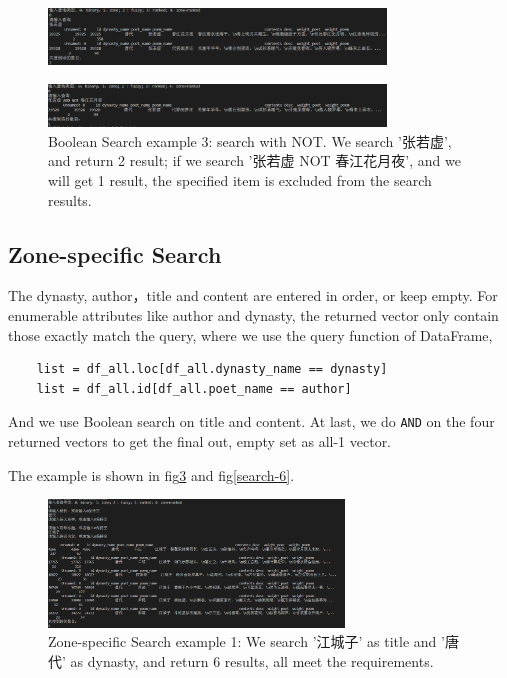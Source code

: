 \begin{figure}[h]
\centering
\includegraphics[width=0.8\textwidth]{figure/not-1.png}
\label{search-3}
\end{figure}

\begin{figure}[h]
\centering
\includegraphics[width=0.8\textwidth]{figure/not-2.png}
\caption{Boolean Search example 3: search with NOT. We search '张若虚', and return 2 result; if we search '张若虚 NOT 春江花月夜', and we will get 1 result, the specified item is excluded from the search results. }
\label{search-4}
\end{figure}


\subsection{Zone-specific Search}

The dynasty, author，title and content are entered in order, or keep empty. For enumerable attributes like author and dynasty, the returned vector only contain those exactly match the query, where we use the query function of DataFrame, 

\begin{lstlisting}
    list = df_all.loc[df_all.dynasty_name == dynasty]
    list = df_all.id[df_all.poet_name == author]
\end{lstlisting}

And we use Boolean search on title and content. At last, we do \lstinline{AND} on the four returned vectors to get the final out, empty set as all-1 vector.

The example is shown in fig\ref{search-5} and fig\ref{search-6}.

\begin{figure}[h]
\centering
\includegraphics[width=0.7\textwidth]{figure/zone-1.png}
\caption{Zone-specific Search example 1: We search '江城子' as title and '唐代' as dynasty, and return 6 results, all meet the requirements.}
\label{search-5}
\end{figure}

